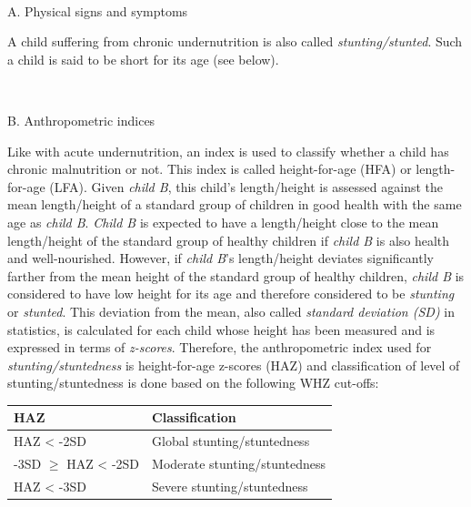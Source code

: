 \documentclass[12pt,]{book}
\theoremstyle{definition}
\theoremstyle{definition}
\theoremstyle{definition}
\theoremstyle{remark}
\begin{document}
~

A. Physical signs and symptoms

A child suffering from chronic undernutrition is also called
\emph{stunting/stunted}. Such a child is said to be short for its age
(see below).

~

B. Anthropometric indices

Like with acute undernutrition, an index is used to classify whether a
child has chronic malnutrition or not. This index is called
height-for-age (HFA) or length-for-age (LFA). Given \emph{child B}, this
child's length/height is assessed against the mean length/height of a
standard group of children in good health with the same age as
\emph{child B}. \emph{Child B} is expected to have a length/height close
to the mean length/height of the standard group of healthy children if
\emph{child B} is also health and well-nourished. However, if
\emph{child B}'s length/height deviates significantly farther from the
mean height of the standard group of healthy children, \emph{child B} is
considered to have low height for its age and therefore considered to be
\emph{stunting} or \emph{stunted}. This deviation from the mean, also
called \emph{standard deviation (SD)} in statistics, is calculated for
each child whose height has been measured and is expressed in terms of
\emph{z-scores}. Therefore, the anthropometric index used for
\emph{stunting/stuntedness} is height-for-age z-scores (HAZ) and
classification of level of stunting/stuntedness is done based on the
following WHZ cut-offs:

\begin{longtable}[]{@{}ll@{}}
\toprule
\begin{minipage}[b]{0.34\columnwidth}\raggedright
\textbf{HAZ}\strut
\end{minipage} & \begin{minipage}[b]{0.47\columnwidth}\raggedright
\textbf{Classification}\strut
\end{minipage}\tabularnewline
\midrule
\endhead
\begin{minipage}[t]{0.34\columnwidth}\raggedright
HAZ \textless{} -2SD\strut
\end{minipage} & \begin{minipage}[t]{0.47\columnwidth}\raggedright
Global stunting/stuntedness\strut
\end{minipage}\tabularnewline
\begin{minipage}[t]{0.34\columnwidth}\raggedright
-3SD \(\geq\) HAZ \textless{} -2SD\strut
\end{minipage} & \begin{minipage}[t]{0.47\columnwidth}\raggedright
Moderate stunting/stuntedness\strut
\end{minipage}\tabularnewline
\begin{minipage}[t]{0.34\columnwidth}\raggedright
HAZ \textless{} -3SD\strut
\end{minipage} & \begin{minipage}[t]{0.47\columnwidth}\raggedright
Severe stunting/stuntedness\strut
\end{minipage}\tabularnewline
\bottomrule
\end{longtable}
\end{document}
